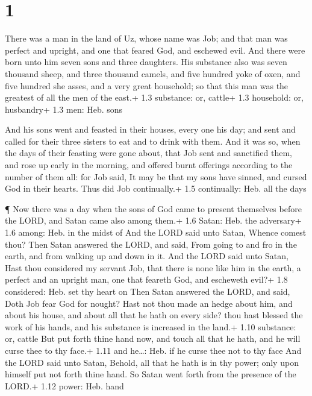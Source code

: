 \hypertarget{section}{%
\section{1}\label{section}}

 There was a man in the land of Uz, whose name was Job; and
that man was perfect and upright, and one that feared God, and eschewed
evil.  And there were born unto him seven sons and three
daughters.  His substance also was seven thousand sheep, and
three thousand camels, and five hundred yoke of oxen, and five hundred
she asses, and a very great household; so that this man was the greatest
of all the men of the east.+ 1.3 substance: or, cattle+ 1.3 household:
or, husbandry+ 1.3 men: Heb. sons

 And his sons went and feasted in their houses, every one
his day; and sent and called for their three sisters to eat and to drink
with them.  And it was so, when the days of their feasting
were gone about, that Job sent and sanctified them, and rose up early in
the morning, and offered burnt offerings according to the number of them
all: for Job said, It may be that my sons have sinned, and cursed God in
their hearts. Thus did Job continually.+ 1.5 continually: Heb. all the
days

 ¶ Now there was a day when the sons of God came to present
themselves before the LORD, and Satan came also among them.+ 1.6 Satan:
Heb. the adversary+ 1.6 among: Heb. in the midst of  And the
LORD said unto Satan, Whence comest thou? Then Satan answered the LORD,
and said, From going to and fro in the earth, and from walking up and
down in it.  And the LORD said unto Satan, Hast thou
considered my servant Job, that there is none like him in the earth, a
perfect and an upright man, one that feareth God, and escheweth evil?+
1.8 considered: Heb. set thy heart on  Then Satan answered
the LORD, and said, Doth Job fear God for nought?  Hast not
thou made an hedge about him, and about his house, and about all that he
hath on every side? thou hast blessed the work of his hands, and his
substance is increased in the land.+ 1.10 substance: or, cattle
 But put forth thine hand now, and touch all that he hath,
and he will curse thee to thy face.+ 1.11 and he\ldots: Heb. if he curse
thee not to thy face  And the LORD said unto Satan, Behold,
all that he hath is in thy power; only upon himself put not forth thine
hand. So Satan went forth from the presence of the LORD.+ 1.12 power:
Heb. hand


